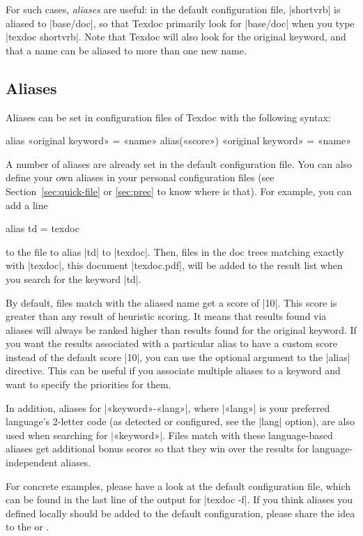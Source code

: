\documentclass{texdoc-doc}
\begin{document}
For such cases, \emph{aliases} are useful: in the default configuration file,
|shortvrb| is aliased to |base/doc|, so that Texdoc primarily look for
|base/doc| when you type |texdoc shortvrb|. Note that Texdoc will also look for
the original keyword, and that a name can be aliased to more than one new
name.

\subsection{Aliases}
\label{sec:alias}

Aliases can be set in configuration files of Texdoc with the following syntax:
%
\begin{htcode}
alias «original keyword» = «name»
alias(«score») «original keyword» = «name»
\end{htcode}
%
A number of aliases are already set in the default configuration file. You can
also define your own aliases in your personal configuration files (see
Section~\ref{sec:quick-file} or \ref{sec:prec} to know where is that). For example,
you can add a line
%
\begin{htcode}
alias td = texdoc
\end{htcode}
%
to the file to alias |td| to |texdoc|. Then, files in the doc trees matching
exactly with |texdoc|, \ie this document |texdoc.pdf|, will be added to the
result list when you search for the keyword |td|.

By default, files match with the aliased name get a score of |10|. This score
is greater than any result of heuristic scoring. It means that results found
via aliases will always be ranked higher than results found for the original
keyword. If you want the results associated with a particular alias to have a
custom score instead of the default score |10|, you can use the optional
argument to the |alias| directive. This can be useful if you associate multiple
aliases to a keyword and want to specify the priorities for them.

In addition, aliases for |«keyword»-«lang»|, where |«lang»| is your preferred
language's 2-letter code (as detected or configured, see the |lang| option), are
also used when searching for |«keyword»|. Files match with these language-based
aliases get additional bonus scores so that they win over the results for
language-independent aliases.

For concrete examples, please have a look at the default configuration file,
which can be found in the last line of the output for |texdoc -f|. If you think
aliases you defined locally should be added to the default configuration,
please share the idea to the {\TexdocML} or {\TexdocRepo}.
\end{document}
